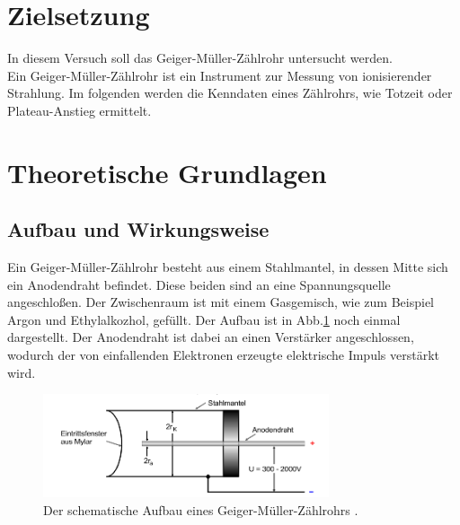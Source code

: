 \section{Zielsetzung}
In diesem Versuch soll das Geiger-Müller-Zählrohr untersucht werden.\\
Ein Geiger-Müller-Zählrohr ist ein Instrument zur Messung von ionisierender Strahlung.
Im folgenden werden die Kenndaten eines Zählrohrs, wie Totzeit oder Plateau-Anstieg ermittelt.



\section{Theoretische Grundlagen}

\subsection{Aufbau und Wirkungsweise}

\noindent
Ein Geiger-Müller-Zählrohr besteht aus einem Stahlmantel, in dessen Mitte sich ein Anodendraht befindet. Diese beiden sind an eine Spannungsquelle angeschloßen.
Der Zwischenraum ist mit einem Gasgemisch, wie zum Beispiel Argon und Ethylalkozhol, gefüllt. Der Aufbau ist in Abb.\ref{img:aufbau} noch einmal dargestellt. 
Der Anodendraht ist dabei an einen
Verstärker angeschlossen, wodurch der von einfallenden Elektronen erzeugte elektrische Impuls verstärkt wird.

\begin{figure}[H]
    \centering
    \includegraphics[width=0.75\textwidth]{images/Aufbau.PNG}
    \caption{Der schematische Aufbau eines Geiger-Müller-Zählrohrs \protect \cite{V703}.}
    \label{img:aufbau}
\end{figure}

